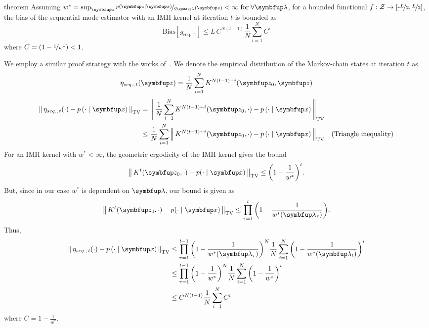 
\begin{theoremEnd}{theorem}\label{thm:bias_seq}
  Assuming \(w^* = \sup_{\vz} \nicefrac{p\left(\vz\mid\vx\right)}{q_{\vlambda}\left(\vz\right)} < \infty\; \text{for} \; \forall \vlambda \), for a bounded functional \(f : \mathcal{Z} \rightarrow \left[ \text{-}\nicefrac{L}{2}, \nicefrac{L}{2} \right] \), the bias of the sequential mode estimator with an IMH kernel at iteration \(t\) is bounded as
  {\small
  \[
    \mathrm{Bias}\left[ g_{\mathrm{seq.,\, t}} \right] \leq L \, C^{N (t-1)} \frac{1}{N} \sum_{i=1}^N {C}^i
  \]
  }
  where \(C = \left(1 - \nicefrac{1}{w^*}\right) < 1\).
\end{theoremEnd}
%
\begin{proofEnd}
  We employ a similar proof strategy with the works of~\citet[Theorem 4]{jiang_mcmc_2021}.
  We denote the empirical distribution of the Markov-chain states at iteration \(t\) as
  \begin{align}
    \eta_{seq.,\, t}(\vz) = \frac{1}{N} \sum_{i=1}^N K^{N (t-1) + i}(\vz_0, \vz)
  \end{align}
  \begin{align}
    \DTV{ \eta_{seq.,\, t}(\cdot) }{p\left(\cdot\mid\vx\right)}
    &= \DTV{\frac{1}{N} \sum_{i=1}^N K^{N (t-1) + i}(\vz_0, \cdot)}{p\left(\cdot\mid\vx\right)} \\
    &\leq \frac{1}{N} \sum_{i=1}^N  \DTV{K^{N (t-1) + i}(\vz_0, \cdot)}{p\left(\cdot\mid\vx\right)} &\text{(Triangle inequality)} \\
  \end{align}
 For an IMH kernel with \(w^* < \infty\), the geometric ergodicity of the IMH kernel \citep[Theorem 2.1]{10.2307/2242610} gives the bound
 \begin{align}
   \DTV{K^t(\vz_{0}, \cdot)}{p(\cdot\mid\vx)} \leq {\left(1 - \frac{1}{w^*}\right)}^t.
 \end{align}
 But, since in our case \(w^*\) is dependent on \(\vlambda\), our bound is given as
 \begin{align}
   \DTV{K^t(\vz_{0}, \cdot)}{p(\cdot\mid\vx)} \leq \prod_{\tau=1}^t {\left(1 - \frac{1}{w^*(\vlambda_{\tau})}\right)}.
 \end{align}
 Thus, 
  \begin{align}
    \DTV{ \eta_{seq.,\, t}(\cdot) }{p\left(\cdot\mid\vx\right)}
    &\leq  \prod_{\tau=1}^{t-1} {\left( 1 - \frac{1}{w^*(\vlambda_{\tau})} \right)}^N \frac{1}{N} \sum_{i=1}^N {\left( 1 - \frac{1}{w^*(\vlambda_{t})} \right)}^i \\
    &\leq  \prod_{\tau=1}^{t-1} {\left( 1 - \frac{1}{w^*} \right)}^N \frac{1}{N} \sum_{i=1}^N {\left( 1 - \frac{1}{w^*} \right)}^i \\
    &\leq C^{N (t-1)} \frac{1}{N} \sum_{i=1}^N C^i %
  \end{align}
  where \(C = 1 - \frac{1}{w^*} \).


\end{proofEnd}
